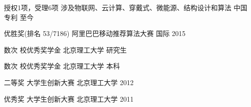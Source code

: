 




\begin{cvhonors}

\cvhonor
{授权1项，受理6项} %
{涉及物联网、云计算、穿戴式、微能源、结构设计和算法} %
{中国专利} %
{至今} %

\cvhonor
{优胜奖(排名 53/7186)} %
{阿里巴巴移动推荐算法大赛} %
{ 国际} %
{2015} %

\cvhonor
{数次} %
{校优秀奖学金} %
{北京理工大学} %
{研究生} %


\cvhonor
{数次} %
{校优秀奖学金} %
{北京理工大学} %
{本科} %


\cvhonor
{二等奖} %
{大学生创新大赛} %
{北京理工大学} %
{2012} %

\cvhonor
{优秀奖} %
{大学生创新大赛} %
{北京理工大学} %
{2011} %


\end{cvhonors}
